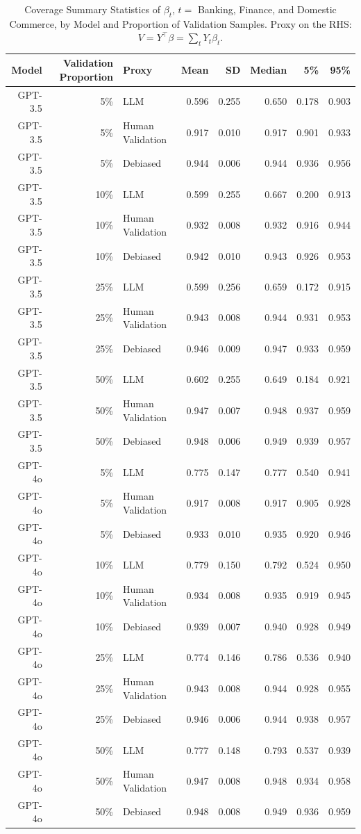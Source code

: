 \begin{table}

\caption{Coverage Summary Statistics of $\beta_{t}$, $t=$ Banking, Finance, and Domestic Commerce, by Model and Proportion of Validation Samples.
      Proxy on the RHS: $V = Y^\top \beta = \sum_{t} Y_t \beta_t$.}
\centering
\begin{tabular}[t]{rrlrrrrr}
\toprule
Model & Validation Proportion & Proxy & Mean & SD & Median & 5\% & 95\%\\
\midrule
GPT-3.5 & 5\% & LLM & 0.596 & 0.255 & 0.650 & 0.178 & 0.903\\
GPT-3.5 & 5\% & Human Validation & 0.917 & 0.010 & 0.917 & 0.901 & 0.933\\
GPT-3.5 & 5\% & Debiased & 0.944 & 0.006 & 0.944 & 0.936 & 0.956\\
GPT-3.5 & 10\% & LLM & 0.599 & 0.255 & 0.667 & 0.200 & 0.913\\
GPT-3.5 & 10\% & Human Validation & 0.932 & 0.008 & 0.932 & 0.916 & 0.944\\
GPT-3.5 & 10\% & Debiased & 0.942 & 0.010 & 0.943 & 0.926 & 0.953\\
GPT-3.5 & 25\% & LLM & 0.599 & 0.256 & 0.659 & 0.172 & 0.915\\
GPT-3.5 & 25\% & Human Validation & 0.943 & 0.008 & 0.944 & 0.931 & 0.953\\
GPT-3.5 & 25\% & Debiased & 0.946 & 0.009 & 0.947 & 0.933 & 0.959\\
GPT-3.5 & 50\% & LLM & 0.602 & 0.255 & 0.649 & 0.184 & 0.921\\
GPT-3.5 & 50\% & Human Validation & 0.947 & 0.007 & 0.948 & 0.937 & 0.959\\
GPT-3.5 & 50\% & Debiased & 0.948 & 0.006 & 0.949 & 0.939 & 0.957\\
GPT-4o & 5\% & LLM & 0.775 & 0.147 & 0.777 & 0.540 & 0.941\\
GPT-4o & 5\% & Human Validation & 0.917 & 0.008 & 0.917 & 0.905 & 0.928\\
GPT-4o & 5\% & Debiased & 0.933 & 0.010 & 0.935 & 0.920 & 0.946\\
GPT-4o & 10\% & LLM & 0.779 & 0.150 & 0.792 & 0.524 & 0.950\\
GPT-4o & 10\% & Human Validation & 0.934 & 0.008 & 0.935 & 0.919 & 0.945\\
GPT-4o & 10\% & Debiased & 0.939 & 0.007 & 0.940 & 0.928 & 0.949\\
GPT-4o & 25\% & LLM & 0.774 & 0.146 & 0.786 & 0.536 & 0.940\\
GPT-4o & 25\% & Human Validation & 0.943 & 0.008 & 0.944 & 0.928 & 0.955\\
GPT-4o & 25\% & Debiased & 0.946 & 0.006 & 0.944 & 0.938 & 0.957\\
GPT-4o & 50\% & LLM & 0.777 & 0.148 & 0.793 & 0.537 & 0.939\\
GPT-4o & 50\% & Human Validation & 0.947 & 0.008 & 0.948 & 0.934 & 0.958\\
GPT-4o & 50\% & Debiased & 0.948 & 0.008 & 0.949 & 0.936 & 0.959\\
\bottomrule
\end{tabular}
\end{table}
